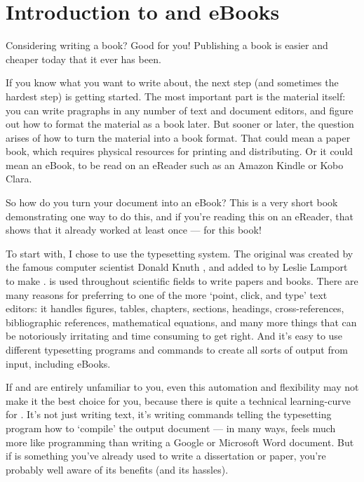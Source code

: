 
\chapter{Introduction to \latex and eBooks}

Considering writing a book? Good for you! Publishing a book is easier and cheaper today 
that it ever has been. 

If you know what you want to write about, the next step (and sometimes the 
hardest step) is getting started. The most important part is the material itself: 
you can write pragraphs in any number of text and document editors, 
and figure out how to format the material as a book later. But sooner or later, 
the question arises of how to turn the material into a book format. That could mean a paper book, 
which requires physical resources for printing and distributing. Or it could mean
an eBook, to be read on an eReader such as an Amazon Kindle or Kobo Clara.

So how do you turn your document into an eBook? This is a very short book demonstrating one 
way to do this, and if you're reading this on an eReader, that shows
that it already worked at least once --- for this book!

To start with, I chose to use the \latex typesetting system. 
The original \tex was created by the famous computer scientist Donald Knuth \citep{knuth1984texbook},
and added to by Leslie Lamport to make \latex \citep{lamport1985latex}.
\latex is used throughout scientific fields to write papers and books. There are many
reasons for preferring \latex to one of the more `point, click, and type' text editors:
it handles figures, tables, chapters, sections, headings, cross-references, 
bibliographic references, mathematical equations, and many more things that can be 
notoriously irritating and time consuming to get right. And it's easy to use different typesetting
programs and commands to create all sorts of output from \latex input, including eBooks.

If \tex and \latex are entirely unfamiliar to you, even this automation and flexibility 
may not make it the best choice for you, because there is quite a technical 
learning-curve for \latex. It's not just writing text, it's writing commands telling the
typesetting program how to `compile' the output document --- in many ways, \latex
feels much more like programming than writing a Google or Microsoft Word document. But if
\latex is something you've already used to write a dissertation or paper, you're 
probably well aware of its benefits (and its hassles). 

